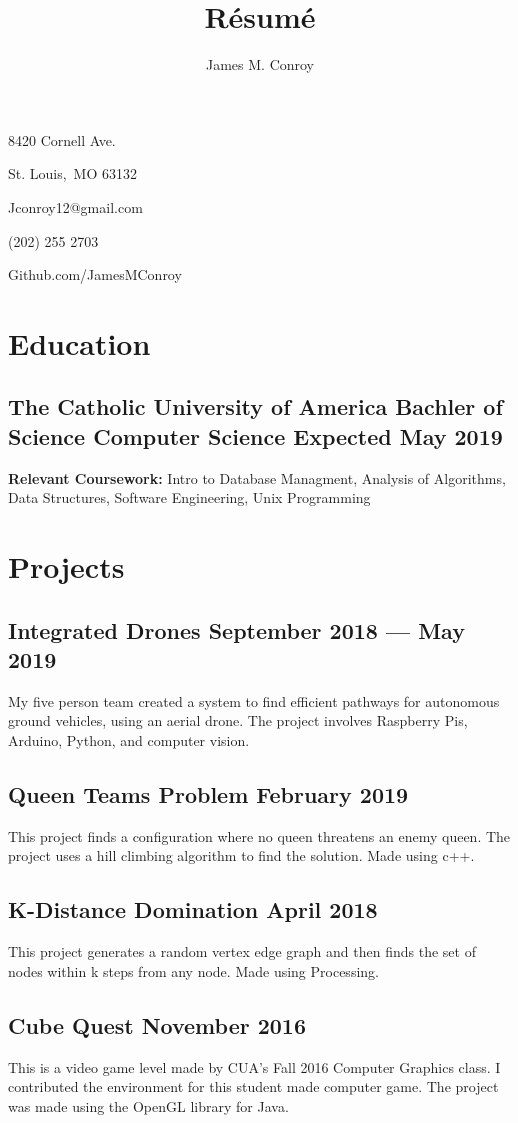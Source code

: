 \documentclass{article}
\author{James M. Conroy}
\title{R\'esum\'e}
\makeatletter
\renewcommand{\maketitle} {
	\begin{center}
	{\huge\bfseries
	\theauthor}

	\end{center}

	8420 Cornell Ave.

	St. Louis,\ MO 63132

	Jconroy12@gmail.com

	(202) 255 2703

	Github.com/JamesMConroy

}
\makeatother
\begin{document}
\maketitle
\section{Education}
\subsection{The Catholic University of America \hfill Bachler of Science Computer Science \hfill  Expected May 2019 }

\textbf {Relevant Coursework:}
Intro to Database Managment,
Analysis of Algorithms,
Data Structures,
Software Engineering,
Unix Programming

\section{Projects}
\subsection{Integrated Drones \hfill September 2018 --- May 2019}
My five person team created a system to find efficient pathways for autonomous ground vehicles, using an aerial drone.
The project involves Raspberry Pis, Arduino, Python, and computer vision.

\subsection{Queen Teams Problem \hfill February 2019}
This project finds a configuration where no queen threatens an enemy queen.
The project uses a hill climbing algorithm to find the solution.
Made using c++.

\subsection{K-Distance Domination \hfill April 2018}
This project generates a random vertex edge graph and then finds the set of nodes within k steps from any node.
Made using Processing.

\subsection{Cube Quest \hfill November 2016}
This is a video game level made by CUA's Fall 2016 Computer Graphics class.
I contributed the environment for this student made computer game.
The project was made using the OpenGL library for Java.
\end{document}
